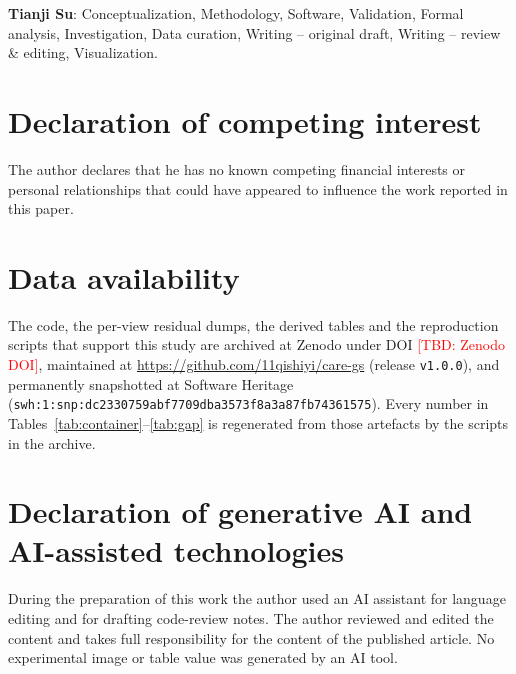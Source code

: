 \documentclass[preprint,number,3p]{elsarticle}
\newcommand{\TBD}[1]{\textcolor{red}{[TBD: #1]}}
\begin{document}
\textbf{Tianji Su}: Conceptualization, Methodology, Software, Validation, Formal analysis, Investigation, Data
curation, Writing -- original draft, Writing -- review \& editing, Visualization.

\section*{Declaration of competing interest}

The author declares that he has no known competing financial interests or personal relationships that could have
appeared to influence the work reported in this paper.

\section*{Data availability}

The code, the per-view residual dumps, the derived tables and the reproduction scripts that support this study are
archived at Zenodo under DOI \TBD{Zenodo DOI}, maintained at
\url{https://github.com/11qishiyi/care-gs} (release \texttt{v1.0.0}), and permanently snapshotted at
Software Heritage (\texttt{swh:1:snp:dc2330759abf7709dba3573f8a3a87fb74361575}). Every number in
Tables~\ref{tab:container}--\ref{tab:gap} is regenerated from those artefacts by the scripts in the archive.

\section*{Declaration of generative AI and AI-assisted technologies}

During the preparation of this work the author used an AI assistant for language editing and for drafting
code-review notes. The author reviewed and edited the content and takes full responsibility for the content of the
published article. No experimental image or table value was generated by an AI tool.



\end{document}
